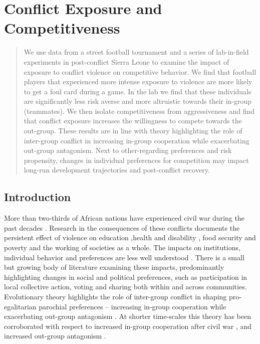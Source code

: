 \chapter{Conflict Exposure and Competitiveness}

\label{chap:slfootball}
\renewcommand{\thetable}{\arabic{chapter}.\arabic{table}}


\begin{abstract}
	We use data from a street football tournament and a series of lab-in-field experiments in post-conflict Sierra Leone to examine the impact of exposure to conflict violence on competitive behavior. We find that football players that experienced more intense exposure to violence are more likely to get a foul card during a game. In the lab we find that these individuals are significantly less risk averse and more altruistic towards their in-group (teammates). We then isolate competitiveness from aggressiveness and find that conflict exposure increases the willingness to compete towards the out-group. These results are in line with theory highlighting the role of inter-group conflict in increasing in-group cooperation while exacerbating out-group antagonism. Next to other-regarding preferences and risk propensity, changes in individual preferences for competition may impact long-run development trajectories and post-conflict recovery.
\end{abstract}


\section{Introduction}
More than two-thirds of African nations have experienced civil war during the past decades \citep{Themner2014}. Research in the consequences of these conflicts documents the persistent effect of violence on education \citep{Lai2007a,Chamarbagwala2011},health and disability \citep{Ghobarah2003,Iqbal2006a,Iqbal2010a}, food security and poverty \citep{Gates2012} and the working of societies as a whole. The impacts on institutions, individual behavior and preferences are less well understood \citep{Blattman2010b}. There is a small but growing body of literature examining these impacts, predominantly highlighting changes in social and political preferences, such as participation in local collective action, voting and sharing both within and across communities. Evolutionary theory highlights the role of inter-group conflict in shaping pro-egalitarian parochial preferences – increasing in-group cooperation while exacerbating out-group antagonism \cite{Bowles2006b,Bernhard2006b,Choi2007a}. At shorter time-scales this theory has been corroborated with respect to increased in-group cooperation after civil war \cite{Bellows2009b,Voors2012,Gilligan2014,Bauer2014}, and increased out-group antagonism \citep{Miguel2011b}.

